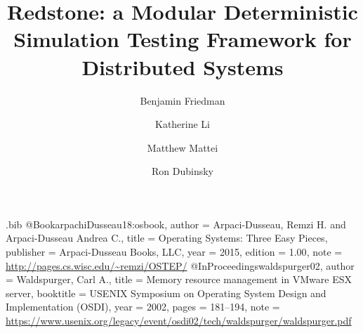\usepackage{filecontents}

\begin{filecontents}{\jobname.bib}
@Book{arpachiDusseau18:osbook,
author =       {Arpaci-Dusseau, Remzi H. and Arpaci-Dusseau Andrea C.},
title =        {Operating Systems: Three Easy Pieces},
publisher =    {Arpaci-Dusseau Books, LLC},
year =         2015,
edition =      {1.00},
note =         {\url{http://pages.cs.wisc.edu/~remzi/OSTEP/}}
}
@InProceedings{waldspurger02,
author =       {Waldspurger, Carl A.},
title =        {Memory resource management in {VMware ESX} server},
booktitle =    {USENIX Symposium on Operating System Design and
Implementation (OSDI)},
year =         2002,
pages =        {181--194},
note =         {\url{https://www.usenix.org/legacy/event/osdi02/tech/waldspurger/waldspurger.pdf}}}
\end{filecontents}



\date{}

\title{\Large \bf Redstone: a Modular Deterministic Simulation Testing Framework for Distributed Systems}

\author{
{\rm Benjamin Friedman}\\
\and
{\rm Katherine Li}\\
\and
{\rm Matthew Mattei}\\
\and
{\rm Ron Dubinsky}\\
} %

\maketitle

